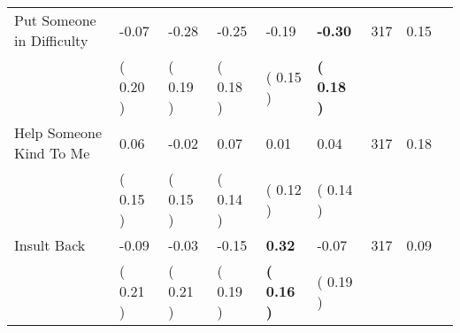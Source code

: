 \begin{tabular}{L{6.2cm} C{1.8cm} C{1.8cm} C{1.8cm} C{1.8cm} C{1.8cm} C{1.8cm} C{0.3cm} C{0.3cm}}
Put Someone in Difficulty &     -0.07 &     -0.28 &     -0.25 &     -0.19 & \textbf{    -0.30}  & 317 &       0.15 \\ 
 & (     0.20 ) & (     0.19 ) & (     0.18 ) & (     0.15 ) & \textbf{(     0.18 )}  & \\
Help Someone Kind To Me &      0.06 &     -0.02 &      0.07 &      0.01 &      0.04  & 317 &       0.18 \\ 
 & (     0.15 ) & (     0.15 ) & (     0.14 ) & (     0.12 ) & (     0.14 )  & \\
Insult Back &     -0.09 &     -0.03 &     -0.15 & \textbf{     0.32} &     -0.07  & 317 &       0.09 \\ 
 & (     0.21 ) & (     0.21 ) & (     0.19 ) & \textbf{(     0.16 )} & (     0.19 )  & \\
\bottomrule
\end{tabular}
